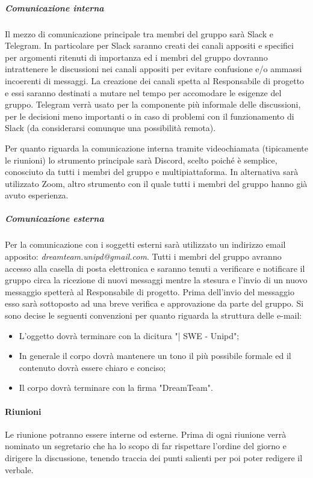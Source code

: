 \subparagraph{Comunicazione interna}
Il mezzo di comunicazione principale tra membri del gruppo sarà Slack e Telegram.
In particolare per Slack saranno creati dei canali appositi e specifici per argomenti ritenuti di importanza ed i membri del gruppo dovranno intrattenere le discussioni nei canali appositi per evitare confusione e/o ammassi incoerenti di messaggi. La creazione dei canali spetta al Responsabile di progetto e essi saranno destinati a mutare nel tempo per accomodare le esigenze del gruppo.
Telegram verrà usato per la componente più informale delle discussioni, per le decisioni meno importanti o in caso di problemi con il funzionamento di Slack (da considerarsi comunque una possibilità remota). 

Per quanto riguarda la comunicazione interna tramite videochiamata (tipicamente le riunioni) lo strumento principale sarà Discord, scelto poiché è semplice, conosciuto da tutti i membri del gruppo e multipiattaforma. In alternativa sarà utilizzato Zoom, altro strumento con il quale tutti i membri del gruppo hanno già avuto esperienza.

\subparagraph{Comunicazione esterna}
 Per la comunicazione con i soggetti esterni sarà utilizzato un indirizzo email apposito: \textit{dreamteam.unipd@gmail.com}.
Tutti i membri del gruppo avranno accesso alla casella di posta elettronica e saranno tenuti a verificare e notificare il gruppo circa la ricezione di nuovi messaggi mentre la stesura e l'invio di un nuovo messaggio spetterà al Responsabile di progetto.
Prima dell'invio del messaggio esso sarà sottoposto ad una breve verifica e approvazione da parte del gruppo.
Si sono decise le seguenti convenzioni per quanto riguarda la struttura delle e-mail:
\begin{itemize}
\item L'oggetto dovrà terminare con la dicitura "| SWE - Unipd";
\item In generale il corpo dovrà mantenere un tono il più possibile formale ed il contenuto dovrà essere chiaro e conciso;
\item Il corpo dovrà terminare con la firma "DreamTeam".
\end{itemize}

\paragraph{Riunioni}
Le riunione potranno essere interne od esterne. Prima di ogni riunione verrà nominato un segretario che ha lo scopo di far rispettare l'ordine del giorno e dirigere la discussione, tenendo traccia dei punti salienti per poi poter redigere il verbale.

